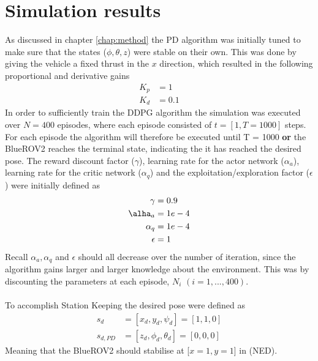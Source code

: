 \chapter{Simulation results}
As discussed in chapter \ref{chap:method} the PD algorithm was initially tuned to make sure that the states ($\phi, \theta, z$) were stable on their own. This was done by giving the vehicle a fixed thrust in the $x$ direction, which resulted in the following proportional and derivative gains
\begin{align}
    K_{p} & = 1 \\
    K_{d} & = 0.1
\end{align}
In order to sufficiently train the DDPG algorithm the simulation was executed over $N = 400$ episodes, where each episode consisted of $t = [1, T=1000]$ steps. For each episode the algorithm will therefore be executed until T = 1000 \textbf{or} the BlueROV2 reaches the terminal state, indicating the it has reached the desired pose. The reward discount factor ($\gamma$), learning rate for the actor network ($\alpha_{a}$), learning rate for the critic network ($\alpha_{q}$) and the exploitation/exploration factor ($\epsilon$) were initially defined as
\begin{align}
    \gamma & = 0.9 \\
    \alha_{a} & = 1e-4 \\
    \alpha_{q} & = 1e-4 \\
    \epsilon & = 1
\end{align}
Recall $\alpha_{a}, \alpha_{q}$ and $\epsilon$ should all decrease over the number of iteration, since the algorithm gains larger and larger knowledge about the environment. This was by discounting the parameters at each episode, $N_{i}$ $(i = 1,...,400)$.\\\\
To accomplish Station Keeping the desired pose were defined as
\begin{align}
    s_{d} & = [x_{d}, y_{d}, \psi_{d}] = [1, 1, 0] \\
    s_{d,PD} & = [z_{d}, \phi_{d}, \theta_{d}] = [0, 0, 0]
\end{align}
Meaning that the BlueROV2 should stabilise at [$x = 1, y = 1$] in (NED).  
